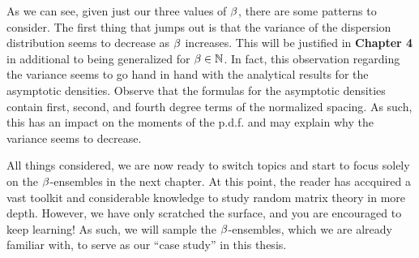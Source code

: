 
As we can see, given just our three values of $\beta$, there are some patterns to consider.
The first thing that jumps out is that the variance of the dispersion distribution seems to decrease as $\beta$ increases.
This will be justified in \textbf{Chapter 4} in additional to being generalized for $\beta \in \mathbb{N}$. In fact, this observation
regarding the variance seems to go hand in hand with the analytical results for the asymptotic densities.
Observe that the formulas for the asymptotic densities contain first, second, and fourth degree terms of the normalized spacing.
As such, this has an impact on the moments of the p.d.f. and may explain why the variance seems to decrease.

\bigskip
\bigskip


All things considered, we are now ready to switch topics and start to focus solely on the $\beta$-ensembles in the next chapter.
At this point, the reader has accquired a vast toolkit and considerable knowledge to study random matrix theory in more depth.
However, we have only scratched the surface, and you are encouraged to keep learning! As such, we will sample the $\beta$-ensembles, which we are already familiar with,
to serve as our ``case study'' in this thesis.

